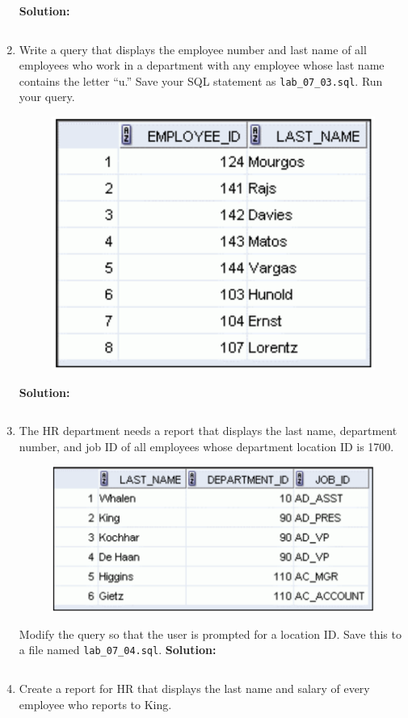 \documentclass[a4paper,12pt]{article}
\begin{document}
\begin{enumerate}
    \textbf{Solution: }
    \begin{lstlisting}[language=SQL]

    \end{lstlisting}
    \newpage
    \item Write a query that displays the employee number and last name of all employees who work in a
department with any employee whose last name contains the letter “u.” Save your SQL
statement as \texttt{lab\_07\_03.sql}. Run your query.
    \begin{figure}[h]
        \centering
            \centering
            \includegraphics[width=.4\linewidth]{graphics/73.png}
    \end{figure}
    
    \textbf{Solution: }
    \begin{lstlisting}[language=SQL]

    \end{lstlisting}
        \item The HR department needs a report that displays the last name, department number, and job ID
of all employees whose department location ID is 1700.
    \begin{figure}[h]
        \centering
            \centering
            \includegraphics[width=.35\linewidth]{graphics/74.png}
    \end{figure}
    Modify the query so that the user is prompted for a location ID. Save this to a file named
\texttt{lab\_07\_04.sql}.
    \newpage
    \textbf{Solution: }
    \begin{lstlisting}[language=SQL]

    \end{lstlisting}
        \item Create a report for HR that displays the last name and salary of every employee who reports to
King.
    

\end{enumerate}
\end{document}
